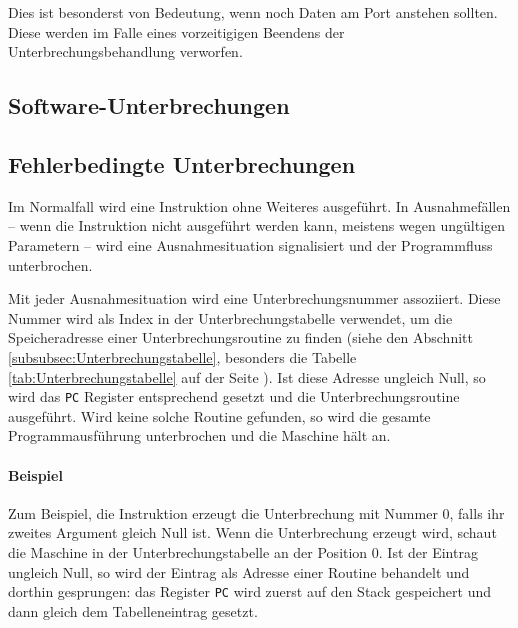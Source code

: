 Dies ist besonderst von Bedeutung, wenn noch Daten am Port anstehen sollten. Diese werden
im Falle eines vorzeitigigen Beendens der Unterbrechungsbehandlung verworfen.

\subsection{Software-Unterbrechungen}

\subsection{Fehlerbedingte Unterbrechungen}

Im Normalfall wird eine Instruktion ohne Weiteres ausgeführt. In Ausnahmefällen
-- wenn die Instruktion nicht ausgeführt werden kann, meistens wegen ungültigen
Parametern -- wird eine Ausnahmesituation signalisiert
und der Programmfluss unterbrochen.


Mit jeder Ausnahmesituation wird eine Unterbrechungsnummer assoziiert. Diese
Nummer wird als Index in der Unterbrechungstabelle verwendet, um die
Speicheradresse einer Unterbrechungsroutine zu finden (siehe den Abschnitt
\ref{subsubsec:Unterbrechungstabelle}, besonders die Tabelle
\ref{tab:Unterbrechungstabelle} auf der Seite
\pageref{tab:Unterbrechungstabelle}). Ist diese Adresse ungleich Null, so wird
das \texttt{PC} Register entsprechend gesetzt und die Unterbrechungsroutine
ausgeführt. Wird keine solche Routine gefunden, so wird die gesamte
Programmausführung unterbrochen und die Maschine hält an.


\paragraph{Beispiel}
Zum Beispiel, die  Instruktion erzeugt die Unterbrechung mit Nummer
0, falls ihr zweites Argument gleich Null ist. Wenn die Unterbrechung erzeugt
wird, schaut die Maschine in der Unterbrechungstabelle an der Position 0. Ist
der Eintrag ungleich Null, so wird der Eintrag als Adresse einer Routine
behandelt und dorthin gesprungen: das Register \texttt{PC} wird
zuerst auf den Stack gespeichert und dann gleich dem Tabelleneintrag gesetzt.

